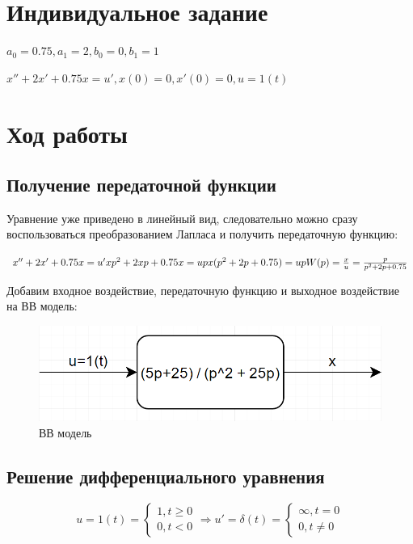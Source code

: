 \documentclass[14pt,a4paper,report]{report}
\begin{document}
\section{Индивидуальное задание}
$a_0=0.75,a_1=2,b_0=0,b_1=1$

$x''+2x'+0.75x=u', x(0)=0, x'(0)=0, u=1(t)$

\section{Ход работы}

\subsection{Получение передаточной функции}

Уравнение уже приведено в линейный вид, следовательно можно сразу воспользоваться преобразованием Лапласа и получить передаточную функцию:

$
\\
x''+2x'+0.75x=u'\\
xp^2+2xp+0.75x=up \\
x(p^2+2p+0.75)=up \\
W(p)=\frac{x}{u}=\frac{p}{p^2+2p+0.75}\\
$

Добавим входное воздействие, передаточную функцию и выходное воздействие на ВВ модель:

\begin{figure}[h!]
	\centering
	\includegraphics[scale = 0.55]{images/ou.png}
	\caption{ВВ модель}
	\label{image:1}
\end{figure}

\clearpage

\subsection{Решение дифференциального уравнения}

\begin{equation*}
	\text{$u=1(t)=$}
	\begin{cases}
		\text{$1, t\geq0$} \\
		\text{$0, t<0$}
	\end{cases}
	\Longrightarrow
	\text{$u'=\delta(t)=$}
	\begin{cases}
		\text{$\infty, t=0$} \\
		\text{$0, t\neq0$}
	\end{cases}
\end{equation*}
\end{document}
